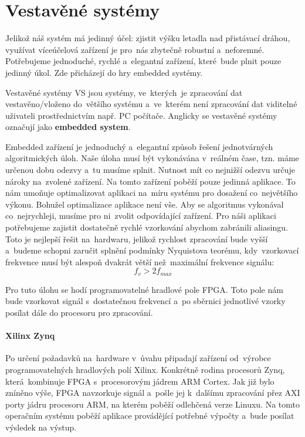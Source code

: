 		\section{Vestavěné systémy}
			Jelikož náš systém má jedinný účel: zjistit výšku letadla nad přistávací dráhou, využívat víceúčelová zařízení je pro~nás zbytečně robustní a~neforemné. Potřebujeme jednoduché, rychlé a~elegantní zařízení, které~bude plnit pouze jedinný úkol. Zde přicházejí do hry embedded systémy.
			
			\begin{definice}
				Vestavěné systémy VS jsou systémy, ve~kterých~je zpracování dat vestavěno/vloženo do~většího systému a~ve~kterém není zpracování dat viditelné uživateli prostřednictvím např. PC počítače. Anglicky se vestavěné systémy označují jako \textbf{embedded system}\cite{impSkripta}.
			\end{definice}
			
			Embedded zařízení je jednoduchý a~elegantní způsob řešení jednotvárných algoritmických úloh. Naše úloha musí být vykonávána v~reálném čase, tzn. máme určenou dobu odezvy a~tu musíme splnit. Nutnost mít co nejnižší odezvu určuje nároky na~zvolené zařízení. Na tomto zařízení poběží pouze jedinná aplikace. To nám umoňuje optimalizovat aplikaci na~míru systému pro dosažení co~největšího výkonu.
			Bohužel optimalizace aplikace není vše. Aby se algoritmus vykonával co~nejrychleji, musíme pro ni~zvolit odpovídající zařízení. Pro náši aplikaci potřebujeme zajistit dostatečně rychlé vzorkování abychom zabránili aliasingu. Toto je nejlepší řešit na~hardwaru, jelikož rychlost zpracování bude vyšší a~budeme schopni zaručit splnění podmínky Nyquistova teorému, kdy~vzorkovací frekvence musí být alespoň dvakrát větší než~maximální frekvence signálu: \[f_v > 2f_{max}\]
			
			Pro tuto úlohu se hodí programovatelné hradlové pole FPGA. Toto pole nám bude vzorkovat signál s~dostatečnou frekvencí a~po sběrnici jednotlivé vzorky posílat dále do procesoru pro zpracování.\par
			
			\paragraph{Xilinx Zynq}
				Po určení požadavků na~hardware v~ůvahu připadají zařízení od~výrobce programovatelných hradlových polí Xilinx. Konkrétně rodina procesorů Zynq, která~kombinuje FPGA s~procesorovým jádrem ARM Cortex.
				Jak již bylo zníněno výše, FPGA navzorkuje signál a~pošle jej k~dalšímu zpracování přez AXI porty jádru procesoru ARM, na kterém poběží odlehčená verze Linuxu. Na tomto operačním systému poběží aplikace provádějící potřebné výpočty a~bude posílat výsledek na výstup.
				
